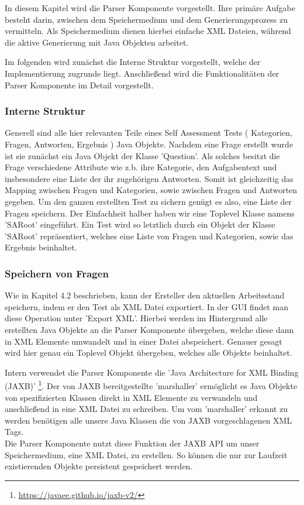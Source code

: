 \label{Tim}
In diesem Kapitel wird die Parser Komponente vorgestellt.
Ihre primäre Aufgabe besteht darin, zwischen dem Speichermedium und dem Generierungsprozess zu vermitteln.
Als Speichermedium dienen hierbei einfache XML Dateien, während die aktive Generierung mit Java Objekten arbeitet.

Im folgenden wird zunächst die Interne Struktur vorgestellt, welche der Implementierung zugrunde liegt. Anschließend wird die Funktionalitäten der Parser Komponente im Detail vorgestellt. 

\subsubsection{Interne Struktur}
Generell sind alle hier relevanten Teile eines Self Assessment Tests ( Kategorien, Fragen, Antworten, Ergebnis ) Java Objekte. 
Nachdem eine Frage erstellt wurde ist sie zunächst ein Java Objekt der Klasse 'Question'.
Als solches besitzt die Frage verschiedene Attribute wie z.b. ihre Kategorie, den Aufgabentext und insbesondere eine Liste der ihr zugehörigen Antworten.
Somit ist gleichzeitig das Mapping zwischen Fragen und Kategorien, sowie zwischen Fragen und Antworten gegeben.
Um den ganzen erstellten Test zu sichern genügt es also, eine Liste der Fragen speichern.
Der Einfachheit halber haben wir eine Toplevel Klasse namens 'SARoot' eingeführt. 
Ein Test wird so letztlich durch ein Objekt der Klasse 'SARoot' repräsentiert, welches eine Liste von Fragen und Kategorien, sowie das Ergebnis beinhaltet.   

\subsubsection{Speichern von Fragen}
Wie in Kapitel 4.2 beschrieben, kann der Ersteller den aktuellen Arbeitsstand speichern, indem er den Test als XML Datei exportiert.
In der GUI findet man diese Operation unter 'Export XML'.
Hierbei werden im Hintergrund alle erstellten Java Objekte an die Parser Komponente übergeben, welche diese dann in XML Elemente umwandelt und in einer Datei abspeichert.
Genauer gesagt wird hier genau ein Toplevel Objekt übergeben, welches alle Objekte beinhaltet.

Intern verwendet die Parser Komponente die 'Java Architecture for XML Binding (JAXB)'
\footnote{\url{https://javaee.github.io/jaxb-v2/}\label{JAXB}}.
Der von JAXB bereitgestellte 'marshaller' ermöglicht es Java Objekte von spezifizierten Klassen direkt in XML Elemente zu verwandeln und anschließend in eine XML Datei zu schreiben.
Um vom 'marshaller' erkannt zu werden benötigen alle unsere Java Klassen die von JAXB vorgeschlagenen XML Tags.\\
Die Parser Komponente nutzt diese Funktion der JAXB API um unser Speichermedium, eine XML Datei, zu erstellen.
So können die nur zur Laufzeit existierenden Objekte persistent gespeichert werden.

